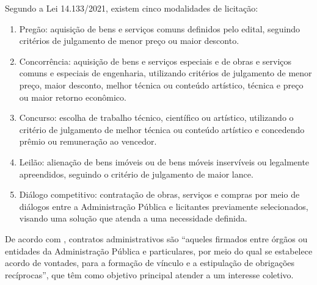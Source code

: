 Segundo a Lei 14.133/2021, existem cinco modalidades de licitação:
\begin{enumerate}
    \item Pregão: aquisição de bens e serviços comuns definidos pelo edital, seguindo critérios de julgamento de menor preço ou maior desconto.
    \item Concorrência: aquisição de bens e serviços especiais e de obras e serviços comuns e especiais de engenharia, utilizando critérios de julgamento de menor preço, maior desconto, melhor técnica ou conteúdo artístico, técnica e preço ou maior retorno econômico.
    \item Concurso: escolha de trabalho técnico, científico ou artístico, utilizando o critério de julgamento de melhor técnica ou conteúdo artístico e concedendo prêmio ou remuneração ao vencedor.
    \item Leilão: alienação de bens imóveis ou de bens móveis inservíveis ou legalmente apreendidos, seguindo o critério de julgamento de maior lance.
    \item Diálogo competitivo: contratação de obras, serviços e compras por meio de diálogos entre a Administração Pública e licitantes previamente selecionados, visando uma solução que atenda a uma necessidade definida.
\end{enumerate}

De acordo com \cite{tcu2023}, contratos administrativos são “aqueles firmados entre órgãos ou entidades da Administração Pública e particulares, por meio do qual se estabelece acordo de vontades, para a formação de vínculo e a estipulação de obrigações recíprocas”, que têm como objetivo principal atender a um interesse coletivo.



